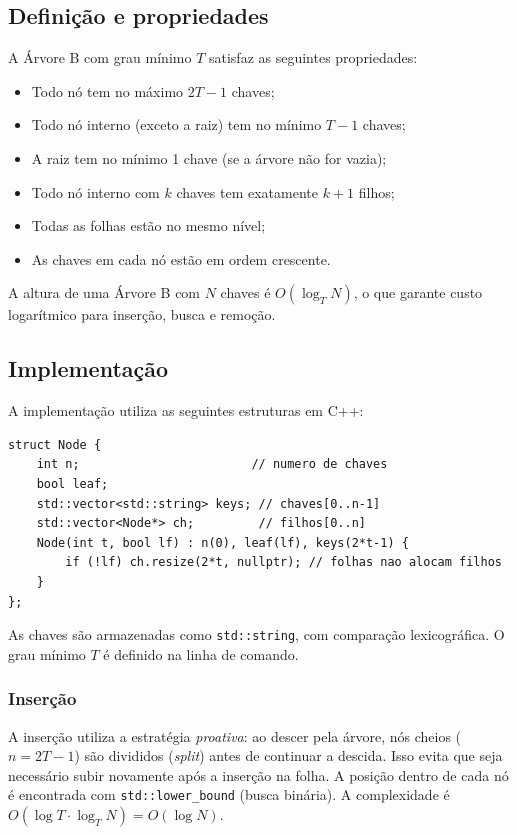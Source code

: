 \documentclass{ifpr-pinhais}
\begin{document}
\subsection{Definição e propriedades}

A Árvore B com grau mínimo $T$ satisfaz as seguintes propriedades:

\begin{itemize}
    \item Todo nó tem no máximo $2T - 1$ chaves;
    \item Todo nó interno (exceto a raiz) tem no mínimo $T - 1$ chaves;
    \item A raiz tem no mínimo 1 chave (se a árvore não for vazia);
    \item Todo nó interno com $k$ chaves tem exatamente $k + 1$ filhos;
    \item Todas as folhas estão no mesmo nível;
    \item As chaves em cada nó estão em ordem crescente.
\end{itemize}

A altura de uma Árvore B com $N$ chaves é $O(\log_T N)$, o que garante custo logarítmico para inserção, busca e remoção.

\subsection{Implementação}

A implementação utiliza as seguintes estruturas em C++:

\begin{lstlisting}
struct Node {
    int n;                        // numero de chaves
    bool leaf;
    std::vector<std::string> keys; // chaves[0..n-1]
    std::vector<Node*> ch;         // filhos[0..n]
    Node(int t, bool lf) : n(0), leaf(lf), keys(2*t-1) {
        if (!lf) ch.resize(2*t, nullptr); // folhas nao alocam filhos
    }
};
\end{lstlisting}

As chaves são armazenadas como \texttt{std::string}, com comparação lexicográfica. O grau mínimo $T$ é definido na linha de comando.

\subsubsection{Inserção}

A inserção utiliza a estratégia \textit{proativa}: ao descer pela árvore, nós cheios ($n = 2T-1$) são divididos (\textit{split}) antes de continuar a descida. Isso evita que seja necessário subir novamente após a inserção na folha. A posição dentro de cada nó é encontrada com \texttt{std::lower\_bound} (busca binária). A complexidade é $O(\log T \cdot \log_T N) = O(\log N)$.
\end{document}
